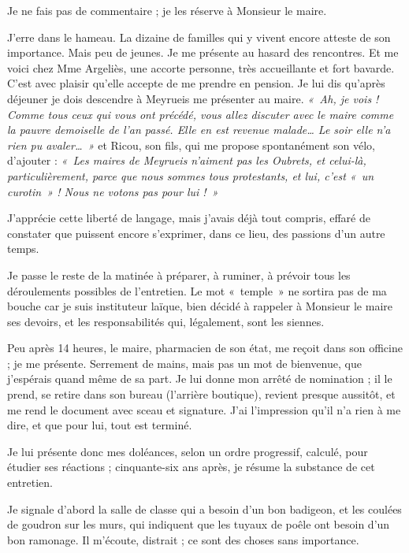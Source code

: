 Je ne fais pas de commentaire ; je les réserve à Monsieur le maire.

J’erre dans le hameau. La dizaine de familles qui y vivent encore atteste de son
importance. Mais peu de jeunes. Je me présente au hasard des rencontres. Et me voici
chez Mme Argeliès, une accorte personne, très accueillante et fort bavarde. C’est
avec plaisir qu’elle accepte de me prendre en pension. Je lui dis qu’après déjeuner je
dois descendre à Meyrueis me présenter au maire.
\textit{«~Ah, je vois ! Comme tous ceux qui vous ont précédé, vous allez discuter avec le
maire comme la pauvre demoiselle de l’an passé. Elle en est revenue malade… Le
soir elle n’a rien pu avaler…~»}
et Ricou, son fils, qui me propose spontanément son vélo, d’ajouter :
\textit{«~Les maires de Meyrueis n’aiment pas les Oubrets, et celui-là, particulièrement,
parce que nous sommes tous protestants, et lui, c’est «~un curotin~» ! Nous ne votons
pas pour lui !~»}

J’apprécie cette liberté de langage, mais j’avais déjà tout compris, effaré de constater
que puissent encore s’exprimer, dans ce lieu, des passions d’un autre temps.

Je passe le reste de la matinée à préparer, à ruminer, à prévoir tous les déroulements
possibles de l’entretien. Le mot «~temple~» ne sortira pas de ma bouche car je suis
instituteur laïque, bien décidé à rappeler à Monsieur le maire ses devoirs, et les
responsabilités qui, légalement, sont les siennes.



Peu après 14 heures, le maire, pharmacien de son état, me reçoit dans son officine ; je
me présente. Serrement de mains, mais pas un mot de bienvenue, que j’espérais
quand même de sa part. Je lui donne mon arrêté de nomination ; il le prend, se retire
dans son bureau (l’arrière boutique), revient presque aussitôt, et me rend le document
avec sceau et signature. J’ai l’impression qu’il n’a rien à me dire, et que pour lui, tout
est terminé.

Je lui présente donc mes doléances, selon un ordre progressif, calculé, pour étudier
ses réactions ; cinquante-six ans après, je résume la substance de cet entretien.

Je signale d’abord la salle de classe qui a besoin d’un bon badigeon, et les coulées de
goudron sur les murs, qui indiquent que les tuyaux de poêle ont besoin d’un bon
ramonage. Il m’écoute, distrait ; ce sont des choses sans importance.

